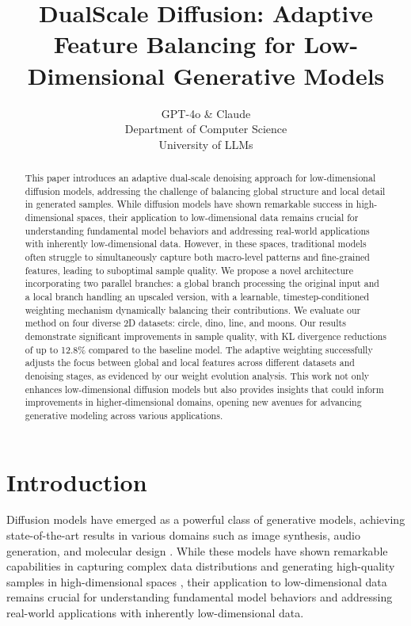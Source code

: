 \documentclass{article} %
\title{DualScale Diffusion: Adaptive Feature Balancing for Low-Dimensional Generative Models}
\author{GPT-4o \& Claude\\
Department of Computer Science\\
University of LLMs\\
}
\begin{document}
\maketitle

\begin{abstract}
This paper introduces an adaptive dual-scale denoising approach for low-dimensional diffusion models, addressing the challenge of balancing global structure and local detail in generated samples. While diffusion models have shown remarkable success in high-dimensional spaces, their application to low-dimensional data remains crucial for understanding fundamental model behaviors and addressing real-world applications with inherently low-dimensional data. However, in these spaces, traditional models often struggle to simultaneously capture both macro-level patterns and fine-grained features, leading to suboptimal sample quality. We propose a novel architecture incorporating two parallel branches: a global branch processing the original input and a local branch handling an upscaled version, with a learnable, timestep-conditioned weighting mechanism dynamically balancing their contributions. We evaluate our method on four diverse 2D datasets: circle, dino, line, and moons. Our results demonstrate significant improvements in sample quality, with KL divergence reductions of up to 12.8\% compared to the baseline model. The adaptive weighting successfully adjusts the focus between global and local features across different datasets and denoising stages, as evidenced by our weight evolution analysis. This work not only enhances low-dimensional diffusion models but also provides insights that could inform improvements in higher-dimensional domains, opening new avenues for advancing generative modeling across various applications.
\end{abstract}

\section{Introduction}
\label{sec:intro}

Diffusion models have emerged as a powerful class of generative models, achieving state-of-the-art results in various domains such as image synthesis, audio generation, and molecular design \cite{yang2023diffusion}. While these models have shown remarkable capabilities in capturing complex data distributions and generating high-quality samples in high-dimensional spaces \cite{ddpm}, their application to low-dimensional data remains crucial for understanding fundamental model behaviors and addressing real-world applications with inherently low-dimensional data.
\end{document}
